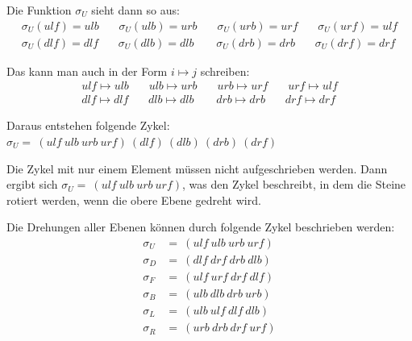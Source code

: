 \documentclass[12pt,a4paper, usenames, dvipsnames]{article}
\begin{document}
Die Funktion $\sigma_U$ sieht dann so aus:
\begin{align*}
\sigma_U(ulf)=ulb \ \ \ \ \ \ \ \ \sigma_U(ulb)=urb \ \ \ \ \ \ \ \ \sigma_U(urb)=urf \ \ \ \ \ \ \ \ \sigma_U(urf)=ulf \\
\sigma_U(dlf)=dlf \ \ \ \ \ \ \ \ \sigma_U(dlb)=dlb \ \ \ \ \ \ \ \ \ \sigma_U(drb)=drb \ \ \ \ \ \ \ \ \sigma_U(drf)=drf 
\end{align*}

Das kann man auch in der Form $i \mapsto j$ schreiben: 
\begin{align*}
ulf \mapsto ulb \ \ \ \ \ \ \ \ ulb \mapsto urb \ \ \ \ \ \ \ \ urb \mapsto urf \ \ \ \ \ \ \ \ urf \mapsto ulf \\
dlf \mapsto dlf \ \ \ \ \ \ \ \ dlb \mapsto dlb \ \ \ \ \ \ \ \ \ drb \mapsto drb \ \ \ \ \ \ \ \ drf \mapsto drf 
\end{align*}

Daraus entstehen folgende Zykel: $\sigma_U = \ (ulf \ ulb \ urb \ urf)\ (dlf)\ (dlb)\ (drb)\ (drf)$

Die Zykel mit nur einem Element müssen nicht aufgeschrieben werden. Dann ergibt sich $\sigma_U = \ (ulf \ ulb \ urb \ urf)$, was den Zykel beschreibt, in dem die Steine rotiert werden, wenn die obere Ebene gedreht wird. 


Die Drehungen aller Ebenen können durch folgende Zykel beschrieben werden: 
\begin{align*}
\sigma_U & =\ (ulf \ ulb \ urb \ urf) \\
\sigma_D & =\ (dlf \ drf \ drb \ dlb) \\
\sigma_F & =\ (ulf \ urf \ drf \ dlf) \\
\sigma_B & =\ (ulb \ dlb \ drb \ urb) \\
\sigma_L & =\ (ulb \ ulf \ dlf \ dlb) \\
\sigma_R & =\ (urb \ drb \ drf \ urf) \\
\end{align*}

%
%
%
%
%
%
%
%
%
%
%
%
%
%
%
%
%
%
%
%
\end{document}

